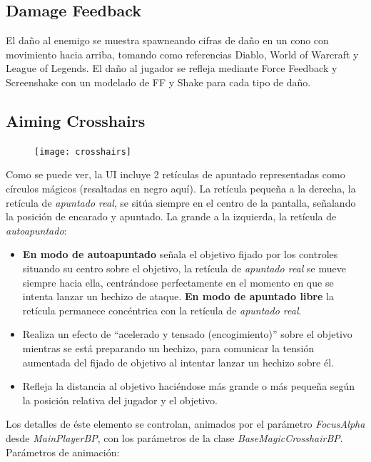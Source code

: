 \documentclass[12pt]{report}
\begin{document}
\subsection{Damage Feedback}

El daño al enemigo se muestra spawneando cifras de daño en un cono con movimiento hacia arriba, tomando como referencias Diablo, World of Warcraft y League of Legends. El daño al jugador se refleja mediante Force Feedback y Screenshake con un modelado de FF y Shake para cada tipo de daño.

\subsection{Aiming Crosshairs}

\begin{figure}[H]
    \centering
    \texttt{[image: crosshairs]}
\end{figure}

Como se puede ver, la UI incluye 2 retículas de apuntado representadas como círculos mágicos (resaltadas en negro aquí). La retícula pequeña a la derecha, la retícula de \textit{apuntado real}, se sitúa siempre en el centro de la pantalla, señalando la posición de encarado y apuntado. La grande a la izquierda, la retícula de \textit{autoapuntado}:

\begin{itemize}
	\item \textbf{En modo de autoapuntado} señala el objetivo fijado por los controles situando su centro sobre el objetivo, la retícula de \textit{apuntado real} se mueve siempre hacia ella, centrándose perfectamente en el momento en que se intenta lanzar un hechizo de ataque. \textbf{En modo de apuntado libre} la retícula permanece concéntrica con la retícula de \textit{apuntado real}.
	\item Realiza un efecto de ``acelerado y tensado (encogimiento)'' sobre el objetivo mientras se está preparando un hechizo, para comunicar la tensión aumentada del fijado de objetivo al intentar lanzar un hechizo sobre él.
	\item Refleja la distancia al objetivo haciéndose más grande o más pequeña según la posición relativa del jugador y el objetivo.
\end{itemize}

Los detalles de éste elemento se controlan, animados por el parámetro \textit{FocusAlpha} desde \textit{\emph{MainPlayerBP}}, con los parámetros de la clase \textit{\emph{BaseMagicCrosshairBP}}. Parámetros de animación:
\end{document}
